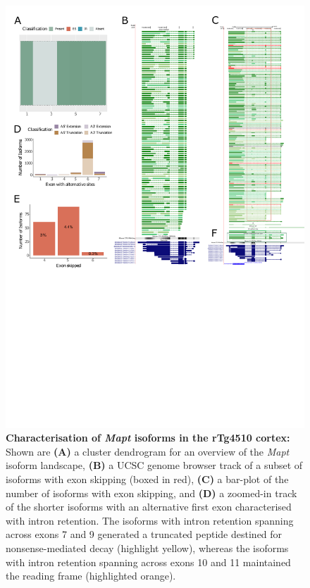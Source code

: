 \begin{figure}[htp]
	\centering
	\includegraphics[page=5,trim={0 10cm 0 0},scale = 0.85]{Figures/TargetGenes_Annotation_Portrait.pdf}
	\captionsetup{width=0.95\textwidth}
	\caption[Characterisation of \textit{Mapt} isoforms in the rTg4510 cortex]%
	{\textbf{Characterisation of \textit{Mapt} isoforms in the rTg4510 cortex:} Shown are \textbf{(A)} a cluster dendrogram for an overview of the \textit{Mapt} isoform landscape, \textbf{(B)} a UCSC genome browser track of a subset of isoforms with exon skipping (boxed in red), \textbf{(C)} a bar-plot of the number of isoforms with exon skipping, and \textbf{(D)} a zoomed-in track of the shorter isoforms with an alternative first exon characterised with intron retention. The isoforms with intron retention spanning across exons 7 and 9 generated a truncated peptide destined for nonsense-mediated decay (highlight yellow), whereas the isoforms with intron retention spanning across exons 10 and 11 maintained the reading frame (highlighted orange).}    
	\label{fig:mapt}
\end{figure}
\restoregeometry

